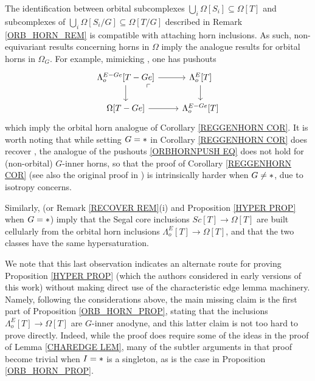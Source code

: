 \documentclass[a4paper,10pt
]{article}%
\begin{document}
\begin{remark}
	The identification between orbital subcomplexes 
	$\bigcup_i \Omega[S_i] \subseteq \Omega[T]$ and subcomplexes of 
	$\bigcup_i \Omega[S_i/G] \subseteq \Omega[T/G]$
	described in Remark \ref{ORB_HORN_REM}
	is compatible with attaching horn inclusions.
	As such, non-equivariant results concerning horns in $\Omega$
	imply the analogue results for orbital horns in $\Omega_G$. For example, mimicking \cite[Lemma 5.1]{MW09}, one has pushouts	
\begin{equation}\label{ORBHORNPUSH EQ}
\begin{tikzcd}
	\Lambda^{E - G e}_o[T - Ge] \arrow[r] \arrow[d]
	\arrow[dr, phantom, "\ulcorner", very near start] &
	\Lambda^{E}_o[T] \arrow[d]
\\
	\Omega[T - G e] \arrow[r]&
	\Lambda^{E - G e}_o[T]
\end{tikzcd}
\end{equation}	
which imply the orbital horn analogue of 
Corollary \ref{REGGENHORN COR}.
It is worth noting that while setting $G=\**$ in 
Corollary \ref{REGGENHORN COR} does recover
\cite[Lemma 5.1]{MW09}, 
the analogue of the pushouts \eqref{ORBHORNPUSH EQ}
does not hold for (non-orbital) $G$-inner horns,
so that the proof of Corollary \ref{REGGENHORN COR}
(see also the original proof in \cite[Prop. 6.17]{Per17})
is intrinsically harder when $G \neq \**$,
due to isotropy concerns.

Similarly, \cite[Props. 2.4 and 2.5]{CM13a} 
(or Remark \ref{RECOVER REM}(i) and Proposition \ref{HYPER PROP} when $G=\**$)
imply that the Segal core inclusions 
$Sc[T] \to \Omega[T]$
are built cellularly from the orbital horn inclusions
$\Lambda^E_o[T] \to \Omega[T]$, and that the two classes have the same hypersaturation. 

	We note that this last observation indicates an alternate route for proving Proposition \ref{HYPER PROP}
	(which the authors considered in early versions of this work)
	without making direct use of the characteristic edge lemma machinery.
	Namely, following the considerations above, the main missing claim is the first part of Proposition \ref{ORB_HORN_PROP}, stating that the inclusions
	$\Lambda^E_o[T] \to \Omega[T]$ are $G$-inner anodyne, and this latter claim is not too hard to prove directly. 
	Indeed, while the proof does require some of the ideas in the proof of Lemma \ref{CHAREDGE LEM},
	many of the subtler arguments in that proof
	become trivial when $I=\**$ is a singleton, as is the case in Proposition \ref{ORB_HORN_PROP}.
\end{remark}
\end{document}
